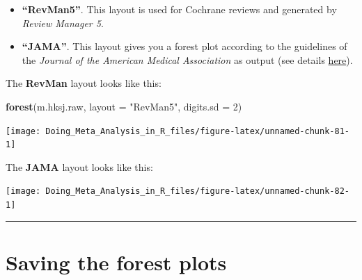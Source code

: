 \documentclass[]{book}
\newenvironment{Shaded}{\begin{snugshade}}{\end{snugshade}}
\newcommand{\DataTypeTok}[1]{\textcolor[rgb]{0.13,0.29,0.53}{#1}}
\newcommand{\DecValTok}[1]{\textcolor[rgb]{0.00,0.00,0.81}{#1}}
\newcommand{\KeywordTok}[1]{\textcolor[rgb]{0.13,0.29,0.53}{\textbf{#1}}}
\newcommand{\NormalTok}[1]{#1}
\newcommand{\StringTok}[1]{\textcolor[rgb]{0.31,0.60,0.02}{#1}}
\providecommand{\tightlist}{%
  \setlength{\itemsep}{0pt}\setlength{\parskip}{0pt}}
\begin{document}
\begin{itemize}
\tightlist
\item
  \textbf{``RevMan5''}. This layout is used for Cochrane reviews and generated by \emph{Review Manager 5}.
\item
  \textbf{``JAMA''}. This layout gives you a forest plot according to the guidelines of the \emph{Journal of the American Medical Association} as output (see details \href{https://jamanetwork.com/journals/jama/pages/instructions-for-authors}{here}).
\end{itemize}

The \textbf{RevMan} layout looks like this:

\begin{Shaded}
\begin{Highlighting}[]
\KeywordTok{forest}\NormalTok{(m.hksj.raw,}
       \DataTypeTok{layout =} \StringTok{"RevMan5"}\NormalTok{,}
       \DataTypeTok{digits.sd =} \DecValTok{2}\NormalTok{)}
\end{Highlighting}
\end{Shaded}

\begin{center}\texttt{[image: Doing\_Meta\_Analysis\_in\_R\_files/figure-latex/unnamed-chunk-81-1]} \end{center}

The \textbf{JAMA} layout looks like this:

\begin{Shaded}
\end{Shaded}

\begin{center}\texttt{[image: Doing\_Meta\_Analysis\_in\_R\_files/figure-latex/unnamed-chunk-82-1]} \end{center}

\begin{center}\rule{0.5\linewidth}{\linethickness}\end{center}

\hypertarget{saving-the-forest-plots}{%
\section{Saving the forest plots}\label{saving-the-forest-plots}}
\end{document}
